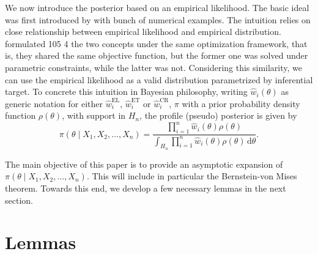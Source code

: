\documentclass[oneside,english]{amsbook}
\numberwithin{section}{chapter}
\numberwithin{equation}{section}
\numberwithin{figure}{section}
\theoremstyle{plain}
\theoremstyle{plain}
\theoremstyle{definition}
\theoremstyle{plain}
\theoremstyle{plain}
\theoremstyle{remark}
\theoremstyle{definition}
\theoremstyle{definition}
\newcommand{\diff}{\,\mathrm{d}}
\begin{document}
We now introduce the posterior based on an empirical likelihood. The
basic ideal was first introduced by \citet{lazar2003bayesian} with
bunch of numerical examples. The intuition relies on close relationship
between empirical likelihood and empirical distribution. \citet{owen2010empirical}
formulated 105 4 the two concepts under the same optimization framework,
that is, they shared the same objective function, but the former one
was solved under parametric constraints, while the latter was not.
Considering this similarity, we can use the empirical likelihood as
a valid distribution parametrized by inferential target. To concrete
this intuition in Bayesian philosophy, writing $\hat{w}_{i}\left(\theta\right)$
as generic notation for either $\hat{w}_{i}^{\mathrm{EL}}$, $\hat{w}_{i}^{\mathrm{ET}}$
or $\hat{w}_{i}^{\mathrm{CR}}$, $\pi$ with a prior probability density
function $\rho\left(\theta\right)$, with support in $H_{n}$, the
profile (pseudo) posterior is given by 
\begin{equation}
\pi\left(\theta\mid X_{1},X_{2},\ldots,X_{n}\right)=\frac{\prod_{i=1}^{n}\hat{w}_{i}\left(\theta\right)\rho\left(\theta\right)}{\int_{H_{n}}\prod_{i=1}^{n}\hat{w}_{i}\left(\theta\right)\rho\left(\theta\right)\diff\theta}.\label{eq:poster-el-expression}
\end{equation}


The main objective of this paper is to provide an asymptotic expansion
of $\pi\left(\theta\mid X_{1},X_{2},\ldots,X_{n}\right)$. This will
include in particular the Bernstein-von Mises theorem. Towards this
end, we develop a few necessary lemmas in the next section.


\section{Lemmas}
\end{document}
